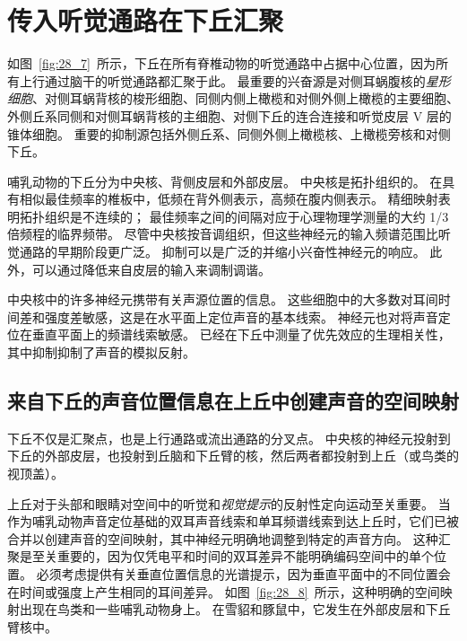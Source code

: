 \section{传入听觉通路在下丘汇聚}

如图~\ref{fig:28_7}~所示，下丘在所有脊椎动物的听觉通路中占据中心位置，因为所有上行通过脑干的听觉通路都汇聚于此。
最重要的兴奋源是对侧耳蜗腹核的\textit{星形细胞}、对侧耳蜗背核的梭形细胞、同侧内侧上橄榄和对侧外侧上橄榄的主要细胞、外侧丘系同侧和对侧耳蜗背核的主细胞、对侧下丘的连合连接和听觉皮层 V 层的锥体细胞。
重要的抑制源包括外侧丘系、同侧外侧上橄榄核、上橄榄旁核和对侧下丘。


哺乳动物的下丘分为中央核、背侧皮层和外部皮层。
中央核是拓扑组织的。 
在具有相似最佳频率的椎板中，低频在背外侧表示，高频在腹内侧表示。
精细映射表明拓扑组织是不连续的； 
最佳频率之间的间隔对应于心理物理学测量的大约 1/3 倍频程的临界频带。
尽管中央核按音调组织，但这些神经元的输入频谱范围比听觉通路的早期阶段更广泛。
抑制可以是广泛的并缩小兴奋性神经元的响应。
此外，可以通过降低来自皮层的输入来调制调谐。


中央核中的许多神经元携带有关声源位置的信息。
这些细胞中的大多数对耳间时间差和强度差敏感，这是在水平面上定位声音的基本线索。
神经元也对将声音定位在垂直平面上的频谱线索敏感。
已经在下丘中测量了优先效应的生理相关性，其中抑制抑制了声音的模拟反射。




\subsection{来自下丘的声音位置信息在上丘中创建声音的空间映射}

下丘不仅是汇聚点，也是上行通路或流出通路的分叉点。
中央核的神经元投射到下丘的外部皮层，也投射到丘脑和下丘臂的核，然后两者都投射到上丘（或鸟类的视顶盖）。


上丘对于头部和眼睛对空间中的听觉和\textit{视觉提示}的反射性定向运动至关重要。
当作为哺乳动物声音定位基础的双耳声音线索和单耳频谱线索到达上丘时，它们已被合并以创建声音的空间映射，其中神经元明确地调整到特定的声音方向。
这种汇聚是至关重要的，因为仅凭电平和时间的双耳差异不能明确编码空间中的单个位置。
必须考虑提供有关垂直位置信息的光谱提示，因为垂直平面中的不同位置会在时间或强度上产生相同的耳间差异。
如图~\ref{fig:28_8}~所示，这种明确的空间映射出现在鸟类和一些哺乳动物身上。
在雪貂和豚鼠中，它发生在外部皮层和下丘臂核中。


